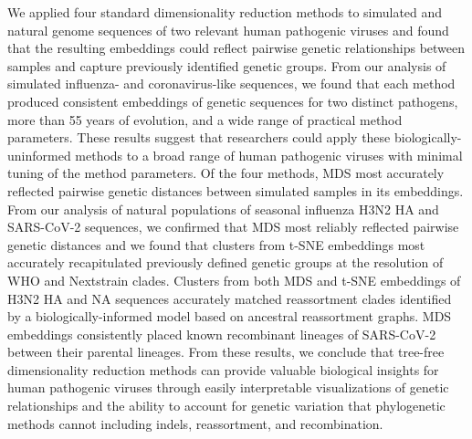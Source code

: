 \documentclass[10pt,letterpaper]{article}
\begin{document}
We applied four standard dimensionality reduction methods to simulated and natural genome sequences of two relevant human pathogenic viruses and found that the resulting embeddings could reflect pairwise genetic relationships between samples and capture previously identified genetic groups.
From our analysis of simulated influenza- and coronavirus-like sequences, we found that each method produced consistent embeddings of genetic sequences for two distinct pathogens, more than 55 years of evolution, and a wide range of practical method parameters.
These results suggest that researchers could apply these biologically-uninformed methods to a broad range of human pathogenic viruses with minimal tuning of the method parameters.
Of the four methods, MDS most accurately reflected pairwise genetic distances between simulated samples in its embeddings.
From our analysis of natural populations of seasonal influenza H3N2 HA and SARS-CoV-2 sequences, we confirmed that MDS most reliably reflected pairwise genetic distances and we found that clusters from t-SNE embeddings most accurately recapitulated previously defined genetic groups at the resolution of WHO and Nextstrain clades.
Clusters from both MDS and t-SNE embeddings of H3N2 HA and NA sequences accurately matched reassortment clades identified by a biologically-informed model based on ancestral reassortment graphs.
MDS embeddings consistently placed known recombinant lineages of SARS-CoV-2 between their parental lineages.
From these results, we conclude that tree-free dimensionality reduction methods can provide valuable biological insights for human pathogenic viruses through easily interpretable visualizations of genetic relationships and the ability to account for genetic variation that phylogenetic methods cannot including indels, reassortment, and recombination.
\end{document}
